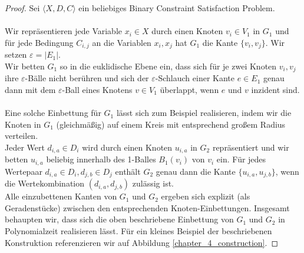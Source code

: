 \documentclass[a4paper, 12pt, twoside]{article}
\theoremstyle{Format1} %
\begin{document}
\begin{proof}
Sei $\langle X,D,C \rangle$ ein beliebiges Binary Constraint Satisfaction Problem.
\\
\\
Wir repräsentieren jede Variable $x_i \in X$ durch einen Knoten $v_i \in V_1$ in $G_1$ und für jede Bedingung $C_{i,j}$ an die Variablen $x_i, x_j$
hat $G_1$ die Kante $\{v_i, v_j\}$. Wir setzen $\varepsilon = |E_1|$.
\\
Wir betten $G_1$ so in die euklidische Ebene ein, dass sich für je zwei Knoten $v_i,v_j$ ihre $\varepsilon$-Bälle nicht berühren und
sich der $\varepsilon$-Schlauch einer Kante $e \in E_1$ genau dann mit dem $\varepsilon$-Ball eines Knotens $v \in V_1$ überlappt, wenn $e$ und $v$ inzident sind.
\\
\\
Eine solche Einbettung für $G_1$ lässt sich zum Beispiel realisieren, indem wir die Knoten in $G_1$ (gleichmäßig) auf einem Kreis mit entsprechend großem Radius verteilen.
\\
Jeder Wert $d_{i,a} \in D_i$ wird durch einen Knoten $u_{i,a}$ in $G_2$ repräsentiert und wir betten $u_{i,a}$ beliebig innerhalb des 1-Balles $B_1(v_i)$ von $v_i$ ein.
Für jedes Wertepaar $d_{i,a} \in D_i, d_{j,b} \in D_j$ enthält $G_2$ genau dann die Kante $\{u_{i,a},u_{j,b}\}$, wenn die Wertekombination $(d_{i,a},d_{j,b})$
zulässig ist.
\\
Alle einzubettenen Kanten von $G_1$ und $G_2$ ergeben sich explizit (als Geradenstücke) zwischen den entsprechenden Knoten-Einbettungen.
Insgesamt behaupten wir, dass sich die oben beschriebene Einbettung von $G_1$ und $G_2$ in Polynomialzeit realisieren lässt.
Für ein kleines Beispiel der beschriebenen Konstruktion referenzieren wir auf Abbildung \ref{chapter_4_construction}.


\end{proof}
\end{document}
